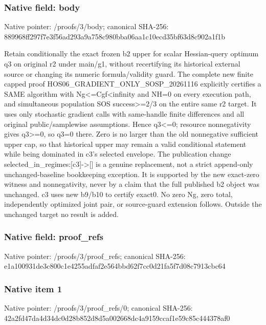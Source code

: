 \documentclass[10pt,a4paper]{article}
\begin{document}
\subsubsection{Native field: body}
Native pointer: /proofs/3/body; canonical SHA-256: 889968ff297f7e3f56ad293a9a758c980bba06aa1c10ecd35bf63d8c902a1f1b

\begingroup\raggedright\sloppy Retain conditionally the exact frozen b2 upper for scalar Hessian-query optimum q3 on original r2 under main/\allowbreak{}g1,\allowbreak{} without recertifying its historical external source or changing its numeric formula/\allowbreak{}validity guard. The complete new finite capped proof HOS06\_\allowbreak{}GRADIENT\_\allowbreak{}ONLY\_\allowbreak{}SOSP\_\allowbreak{}20261116 explicitly certifies a SAME algorithm with Ng<=\allowbreak{}Cgf<infinity and NH=\allowbreak{}0 on every execution path,\allowbreak{} and simultaneous population SOS success>=\allowbreak{}2/\allowbreak{}3 on the entire same r2 target. It uses only stochastic gradient calls with same-handle finite differences and all original public/\allowbreak{}samplewise assumptions. Hence q3<=\allowbreak{}0;\allowbreak{} resource nonnegativity gives q3>=\allowbreak{}0,\allowbreak{} so q3=\allowbreak{}0 there. Zero is no larger than the old nonnegative sufficient upper cap,\allowbreak{} so that historical upper may remain a valid conditional statement while being dominated in c3's selected envelope. The publication change selected\_\allowbreak{}in\_\allowbreak{}regimes:\allowbreak{}[c3]->[] is a genuine replacement,\allowbreak{} not a strict append-only unchanged-baseline bookkeeping exception. It is supported by the new exact-zero witness and nonnegativity,\allowbreak{} never by a claim that the full published b2 object was unchanged. c3 uses new b9/\allowbreak{}b10 to certify exact0. No zero Ng,\allowbreak{} zero total,\allowbreak{} independently optimized joint pair,\allowbreak{} or source-guard extension follows. Outside the unchanged target no result is added.\par\endgroup

\subsubsection{Native field: proof\_\allowbreak{}refs}
Native pointer: /proofs/3/proof\_\allowbreak{}refs; canonical SHA-256: e1a100931de3c800c1e4255adfaf2e564bbd62f7cc0d21fa5f7d08c7913cbc64

\subsubsection{Native item 1}
Native pointer: /proofs/3/proof\_\allowbreak{}refs/0; canonical SHA-256: 42a2fd47da4d34dc0d28b852d8d5a002668dc4a9159ccaf1e59c85c444378af0
\end{document}
